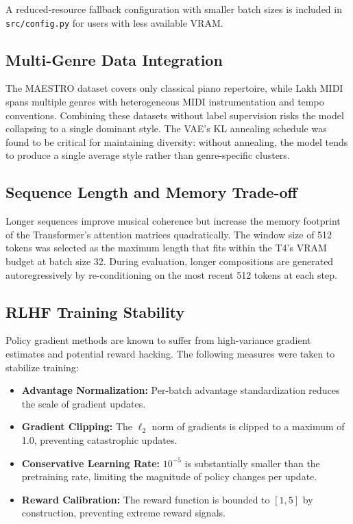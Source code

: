 \documentclass{article}
\begin{document}
A reduced-resource fallback configuration with smaller batch sizes is included in \texttt{src/config.py} for users with less available VRAM.

\subsection{Multi-Genre Data Integration}

The MAESTRO dataset covers only classical piano repertoire, while Lakh MIDI spans multiple genres with heterogeneous MIDI instrumentation and tempo conventions. Combining these datasets without label supervision risks the model collapsing to a single dominant style. The VAE's KL annealing schedule was found to be critical for maintaining diversity: without annealing, the model tends to produce a single average style rather than genre-specific clusters.

\subsection{Sequence Length and Memory Trade-off}

Longer sequences improve musical coherence but increase the memory footprint of the Transformer's attention matrices quadratically. The window size of 512 tokens was selected as the maximum length that fits within the T4's VRAM budget at batch size 32. During evaluation, longer compositions are generated autoregressively by re-conditioning on the most recent 512 tokens at each step.

\subsection{RLHF Training Stability}

Policy gradient methods are known to suffer from high-variance gradient estimates and potential reward hacking. The following measures were taken to stabilize training:

\begin{itemize}
  \item \textbf{Advantage Normalization:} Per-batch advantage standardization reduces the scale of gradient updates.
  \item \textbf{Gradient Clipping:} The $\ell_2$ norm of gradients is clipped to a maximum of 1.0, preventing catastrophic updates.
  \item \textbf{Conservative Learning Rate:} $10^{-5}$ is substantially smaller than the pretraining rate, limiting the magnitude of policy changes per update.
  \item \textbf{Reward Calibration:} The reward function is bounded to $[1, 5]$ by construction, preventing extreme reward signals.
\end{itemize}
\end{document}
